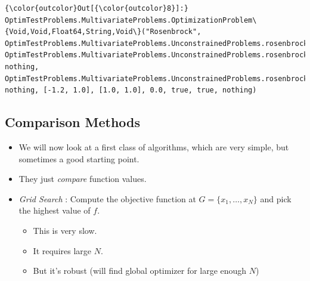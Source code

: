 \documentclass[11pt]{article}
\providecommand{\tightlist}{%
      \setlength{\itemsep}{0pt}\setlength{\parskip}{0pt}}
\begin{document}
\begin{Verbatim}[commandchars=\\\{\}]
{\color{outcolor}Out[{\color{outcolor}8}]:} OptimTestProblems.MultivariateProblems.OptimizationProblem\{Void,Void,Float64,String,Void\}("Rosenbrock", OptimTestProblems.MultivariateProblems.UnconstrainedProblems.rosenbrock, OptimTestProblems.MultivariateProblems.UnconstrainedProblems.rosenbrock\_gradient!, nothing, OptimTestProblems.MultivariateProblems.UnconstrainedProblems.rosenbrock\_hessian!, nothing, [-1.2, 1.0], [1.0, 1.0], 0.0, true, true, nothing)
\end{Verbatim}
            
    \subsection{Comparison Methods}\label{comparison-methods}

\begin{itemize}
\tightlist
\item
  We will now look at a first class of algorithms, which are very
  simple, but sometimes a good starting point.
\item
  They just \emph{compare} function values.
\item
  \emph{Grid Search} : Compute the objective function at
  \(G=\{x_1,\dots,x_N\}\) and pick the highest value of \(f\).

  \begin{itemize}
  \tightlist
  \item
    This is very slow.
  \item
    It requires large \(N\).
  \item
    But it's robust (will find global optimizer for large enough \(N\))
  \end{itemize}
\end{itemize}
\end{document}
